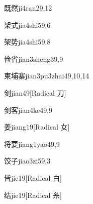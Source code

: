 \begin{verbete}{既然}{ji4ran2}{9,12}
\end{verbete}

\begin{verbete}{架式}{jia4shi5}{9,6}
\end{verbete}

\begin{verbete}{架势}{jia4shi5}{9,8}
\end{verbete}

\begin{verbete}{俭省}{jian3sheng3}{9,9}
\end{verbete}

\begin{verbete}{柬埔寨}{jian3pu3zhai4}{9,10,14}
\end{verbete}

\begin{verbete}{剑}{jian4}{9}[Radical 刀]
\end{verbete}

\begin{verbete}{剑客}{jian4ke4}{9,9}
\end{verbete}

\begin{verbete}{姜}{jiang1}{9}[Radical 女]
\end{verbete}

\begin{verbete}{将要}{jiang1yao4}{9,9}
\end{verbete}

\begin{verbete}{饺子}{jiao3zi5}{9,3}
\end{verbete}

\begin{verbete}{皆}{jie1}{9}[Radical 白]
\end{verbete}

\begin{verbete}{结}{jie1}{9}[Radical 糸]
\end{verbete}

